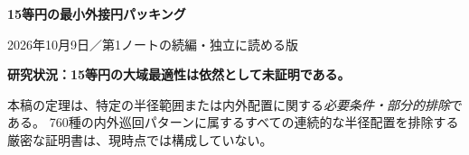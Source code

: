 \documentclass[11pt,a4paper]{article}
\theoremstyle{JPthm}
\theoremstyle{definition}
\newcommand{\Rc}{R_{0}}
\newcommand{\azero}{a_{0}}
\newcommand{\bzero}{b_{0}}
\begin{document}
\begin{center}
{\sffamily\color{ink}\LARGE\bfseries 15等円の最小外接円パッキング}\par
\vspace{2mm}{\sffamily\large 第二研究ノート：壁面化・半径順位・角度予算と大域排除}\par
\vspace{3mm}{\color{sea}\rule{.75\linewidth}{1pt}}\par\vspace{2mm}
{\small 2026年10月9日\quad ／\quad 第1ノートの続編・独立に読める版}
\end{center}
\begin{warningbox}
\textbf{研究状況：15等円の大域最適性は依然として未証明である。}\par
本稿の定理は、特定の半径範囲または内外配置に関する\emph{必要条件・部分的排除}である。
760種の内外巡回パターンに属するすべての連続的な半径配置を排除する
厳密な証明書は、現時点では構成していない。
\end{warningbox}
\begin{abstract}
半径1の合同円15個を最小の円形容器に収納する問題を考える。
最良既知の候補半径は
$\Rc=1+\sqrt{1+(2+\cot(\pi/5))^2}\approx4.5213569647$ である。
第1ノートで得た半径しきい値 $L$ と内外分類を発展させ、
外側に分類されたすべての円を偏角を保ったまま半径 $\bzero=\Rc-1$ の円周へ移せることを厳密に示す。
したがって、容器半径 $R\le\Rc$ の非実現可能性判定は内側5--8円の中心距離だけに帰着できる。
また、順位統計量に対する幾何学的上下界を導き、
内側5円・外側10円の場合には壁面角度予算から
「内側5円が一斉に $\azero=\csc(\pi/5)$ 以上」または「一斉に以下」
という二つの大域領域を排除する。
残る混合領域および内側6--8円の場合の完全排除は未解決である。
\end{abstract}
\tableofcontents
\clearpage
\end{document}
